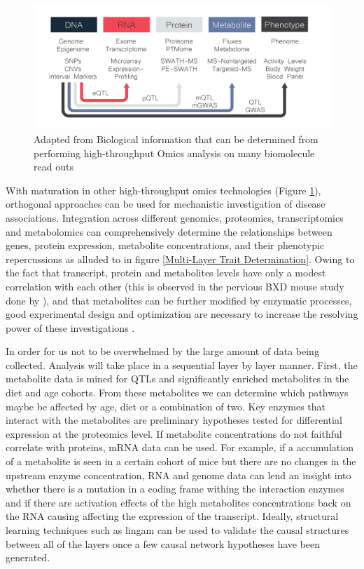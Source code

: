 \documentclass[a4paper,11pt,twoside]{book}
\begin{document}
	\begin{figure}
		\includegraphics[width=1.2\textwidth]{1.Introduction_Figures/Multiomics.pdf}
		\caption{Adapted from \citep{Dumas2012} Biological information that can be determined from performing high-throughput Omics analysis on many biomolecule read outs}
		\label{fig:Multi_Omics Methods}
	\end{figure}
	
	With maturation in other high-throughput omics technologies (Figure \ref{fig:Multi_Omics Methods}), orthogonal approaches can be used for mechanistic investigation of disease associations. Integration across different genomics, proteomics, transcriptomics and metabolomics can comprehensively determine the relationships between genes, protein expression, metabolite concentrations, and their phenotypic repercussions as alluded to in figure \ref{Multi-Layer Trait Determination}. Owing to the fact that transcript, protein and metabolites levels have only a modest correlation with each other (this is observed in the pervious BXD mouse study done by \citeauthor{Williams2016SystemsFunction}), and that metabolites can be further modified by enzymatic processes, good experimental design and optimization are necessary to increase the resolving power of these investigations \citep{Johnson2016Metabolomics:Mechanisms}. 
	
	In order for us not to be overwhelmed by the large amount of data being collected. Analysis will take place in a sequential layer by layer manner. First, the metabolite data is mined for QTLs and significantly enriched metabolites in the diet and age cohorts. From these metabolites we can determine which pathways maybe be affected by age, diet or a combination of two. Key enzymes that interact with the metabolites are preliminary hypotheses tested for differential expression at the proteomics level. If metabolite concentrations do not faithful correlate with proteins, mRNA data can be used. For example, if a accumulation of a metabolite is seen in a certain cohort of mice but there are no changes in the upstream enzyme concentration, RNA and genome data can lend an insight into whether there is a mutation in a coding frame withing the interaction enzymes and if there are activation effects of the high metabolites concentrations back on the RNA causing affecting the expression of the transcript. Ideally, structural learning techniques such as lingam\citep{ShimizuLiNGAM:Structures} can be used to validate the causal structures between all of the layers once a few causal network hypotheses have been generated.
	
\end{document}
